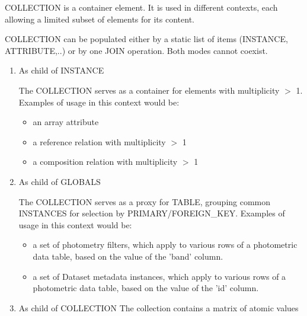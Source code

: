     COLLECTION is a container element.  It is used in different contexts, each allowing a limited subset of elements for its content. 
    
    COLLECTION can be populated either by a static list of items (INSTANCE, ATTRIBUTE,..) or by one JOIN operation. Both  modes cannot coexist.
    
    \begin{enumerate}
    \item{As child of INSTANCE}
      
      The COLLECTION serves as a container for elements with multiplicity $>$ 1.\\
      Examples of usage in this context would be:
      \begin{itemize}
        \item an array attribute
        \item a reference relation with multiplicity $>$ 1
        \item a composition relation with multiplicity $>$ 1
      \end{itemize}
      
    \item{As child of GLOBALS}
          
      The COLLECTION serves as a proxy for TABLE, grouping common INSTANCES for selection by PRIMARY/FOREIGN\_KEY.
      Examples of usage in this context would be:
      \begin{itemize}
        \item a set of photometry filters, which apply to various rows of a photometric data table, based on the value of the 'band' column.
        \item a set of Dataset metadata instances, which apply to various rows of a photometric data table, based on the value of the 'id' column.
      \end{itemize}
          
    \item{As child of COLLECTION}
	The collection contains a matrix of  atomic values
        
    \end{enumerate}
   
